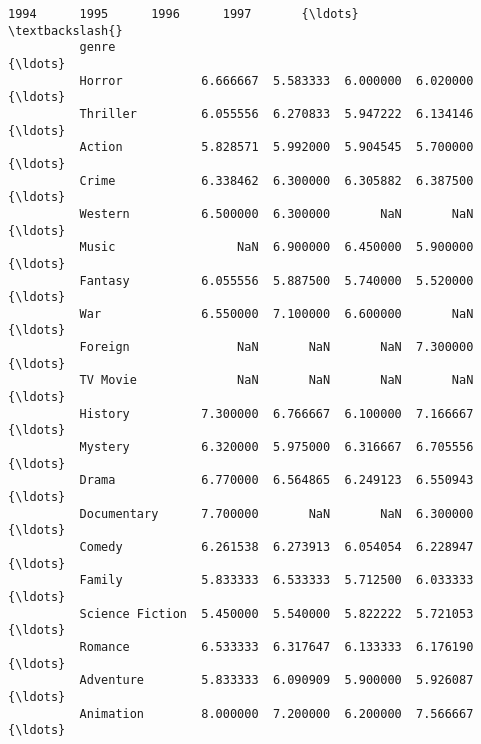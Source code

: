 \documentclass[11pt]{article}
\begin{document}
\begin{Verbatim}[commandchars=\\\{\}]
                               1994      1995      1996      1997       {\ldots}         \textbackslash{}
          genre                                                         {\ldots}          
          Horror           6.666667  5.583333  6.000000  6.020000       {\ldots}          
          Thriller         6.055556  6.270833  5.947222  6.134146       {\ldots}          
          Action           5.828571  5.992000  5.904545  5.700000       {\ldots}          
          Crime            6.338462  6.300000  6.305882  6.387500       {\ldots}          
          Western          6.500000  6.300000       NaN       NaN       {\ldots}          
          Music                 NaN  6.900000  6.450000  5.900000       {\ldots}          
          Fantasy          6.055556  5.887500  5.740000  5.520000       {\ldots}          
          War              6.550000  7.100000  6.600000       NaN       {\ldots}          
          Foreign               NaN       NaN       NaN  7.300000       {\ldots}          
          TV Movie              NaN       NaN       NaN       NaN       {\ldots}          
          History          7.300000  6.766667  6.100000  7.166667       {\ldots}          
          Mystery          6.320000  5.975000  6.316667  6.705556       {\ldots}          
          Drama            6.770000  6.564865  6.249123  6.550943       {\ldots}          
          Documentary      7.700000       NaN       NaN  6.300000       {\ldots}          
          Comedy           6.261538  6.273913  6.054054  6.228947       {\ldots}          
          Family           5.833333  6.533333  5.712500  6.033333       {\ldots}          
          Science Fiction  5.450000  5.540000  5.822222  5.721053       {\ldots}          
          Romance          6.533333  6.317647  6.133333  6.176190       {\ldots}          
          Adventure        5.833333  6.090909  5.900000  5.926087       {\ldots}          
          Animation        8.000000  7.200000  6.200000  7.566667       {\ldots}          
          

\end{Verbatim}
\end{document}
